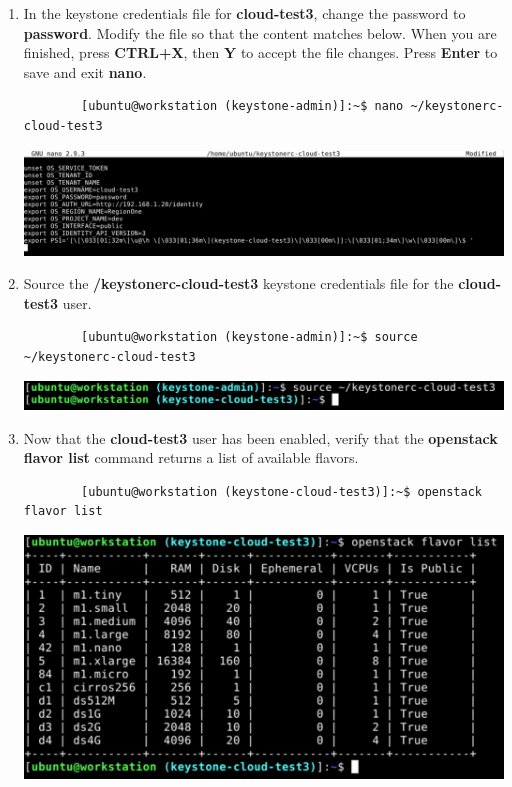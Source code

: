 \documentclass[letterpaper, 12pt]{article}
\begin{document}
\begin{enumerate}
    \item In the keystone credentials file for \textbf{cloud-test3}, change the password to \textbf{password}.
    Modify the file so that the content matches below.
    When you are finished, press \textbf{CTRL+X}, then \textbf{Y} to accept the file changes. Press \textbf{Enter} to save and exit \textbf{nano}.
    \begin{lstlisting}
        [ubuntu@workstation (keystone-admin)]:~$ nano ~/keystonerc-cloud-test3
    \end{lstlisting}

    \begin{center}
        \includegraphics[width=\linewidth]{images/part4/step19.png}
    \end{center}

    \item Source the \textbf{\texttildemid/keystonerc-cloud-test3} keystone credentials file for the
    \textbf{cloud-test3} user.
    \begin{lstlisting}
        [ubuntu@workstation (keystone-admin)]:~$ source ~/keystonerc-cloud-test3
    \end{lstlisting}

    \begin{center}
        \includegraphics[width=\linewidth]{images/part4/step20.png}
    \end{center}

    \item Now that the \textbf{cloud-test3} user has been enabled, verify that the \textbf{openstack flavor list}
    command returns a list of available flavors.
    \begin{lstlisting}
        [ubuntu@workstation (keystone-cloud-test3)]:~$ openstack flavor list
    \end{lstlisting}

    \begin{center}
        \includegraphics[width=\linewidth]{images/part4/step21.png}
    \end{center}


\end{enumerate}
\end{document}
